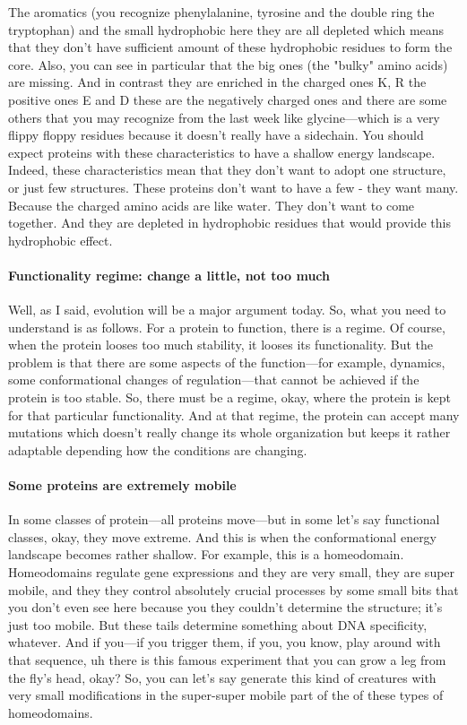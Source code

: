 The aromatics (you recognize phenylalanine, tyrosine and the double ring the tryptophan) and the small hydrophobic here they are all depleted which means that they don’t have sufficient amount of these hydrophobic residues to form the core. Also, you can see in particular that the big ones (the "bulky" amino acids) are missing. And in contrast they are enriched in the charged ones K, R the positive ones E and D these are the negatively charged ones and there are some others that you may recognize from the last week like glycine—which is a very flippy floppy residues because it doesn’t really have a sidechain. You should expect proteins with these characteristics to have a shallow energy landscape. Indeed, these characteristics mean that they don’t want to adopt one structure, or just few structures. These proteins don’t want to have a few  - they want many. Because the charged amino acids are like water. They don’t want to come together. And they are depleted in hydrophobic residues that would provide this hydrophobic effect.


\paragraph{Functionality regime: change a little, not too much}

Well, as I said, evolution will be a major argument today. So, what you need to understand is as follows. For a protein to function, there is a regime. Of course, when the protein looses too much stability, it looses its functionality. But the problem is that there are some aspects of the function—for example, dynamics, some conformational changes of regulation—that cannot be achieved if the protein is too stable. So, there must be a regime, okay, where the protein is kept for that particular functionality. And at that regime, the protein can accept many mutations which doesn't really change its whole organization but keeps it rather adaptable depending how the conditions are changing.

\paragraph{Some proteins are extremely mobile}
In some classes of protein—all proteins move—but in some let's say functional classes, okay, they move extreme. And this is when the conformational energy landscape becomes rather shallow. For example, this is a homeodomain. Homeodomains regulate gene expressions and they are very small, they are super mobile, and they they control absolutely crucial processes by some small bits that you don't even see here because you they couldn't determine the structure; it’s just too mobile. But these tails determine something about DNA specificity, whatever. And if you—if you trigger them, if you, you know, play around with that sequence, uh there is this famous experiment that you can grow a leg from the fly's head, okay? So, you can let's say generate this kind of creatures with very small modifications in the super-super mobile part of the of these types of homeodomains.
